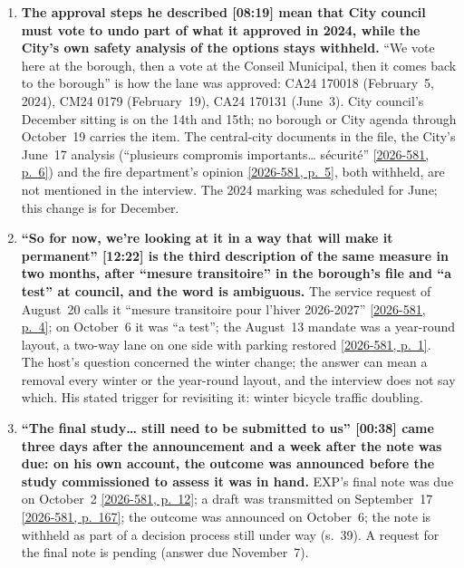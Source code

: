 \documentclass[11pt,letterpaper]{article}
\newcommand{\pagesurl}{https://openmobilitydata.github.io/Terrebonne-access-requests}
\newcommand{\cliptime}[1]{\textsf{\small[#1]}}
\newcommand{\pgl}[2]{\href{\pagesurl/2026-581/raw/01_emails_mandate_counts.pdf\#page=#1}{\textsf{\small[2026-581, p.~#2]}}}
\newcommand{\pg}[1]{\pgl{#1}{#1}}
\begin{document}
\begin{enumerate}[nosep]
  \item \begin{minipage}[t]{\linewidth}\textbf{The approval steps he described \cliptime{08:19} mean that City council must vote to undo part of what it approved in 2024, while the City's own safety analysis of the options stays withheld.} ``We vote here at the borough, then a vote at the Conseil Municipal, then it comes back to the borough'' is how the lane was approved: CA24 170018 (February~5, 2024), CM24 0179 (February~19), CA24 170131 (June~3). City council's December sitting is on the 14th and 15th; no borough or City agenda through October~19 carries the item. The central-city documents in the file, the City's June~17 analysis (``plusieurs compromis importants… sécurité'' \pg{6}) and the fire department's opinion \pg{5}, both withheld, are not mentioned in the interview. The 2024 marking was scheduled for June; this change is for December.\end{minipage}\vspace{0.35em}
  \item \begin{minipage}[t]{\linewidth}\textbf{``So for now, we're looking at it in a way that will make it permanent'' \cliptime{12:22} is the third description of the same measure in two months, after ``mesure transitoire'' in the borough's file and ``a test'' at council, and the word is ambiguous.} The service request of August~20 calls it ``mesure transitoire pour l'hiver 2026-2027'' \pg{4}; on October~6 it was ``a test''; the August~13 mandate was a year-round layout, a two-way lane on one side with parking restored \pg{1}. The host's question concerned the winter change; the answer can mean a removal every winter or the year-round layout, and the interview does not say which. His stated trigger for revisiting it: winter bicycle traffic doubling.\end{minipage}\vspace{0.35em}
  \item \begin{minipage}[t]{\linewidth}\textbf{``The final study… still need to be submitted to us'' \cliptime{00:38} came three days after the announcement and a week after the note was due: on his own account, the outcome was announced before the study commissioned to assess it was in hand.} EXP's final note was due on October~2 \pg{12}; a draft was transmitted on September~17 \pg{167}; the outcome was announced on October~6; the note is withheld as part of a decision process still under way (s.~39). A request for the final note is pending (answer due November~7).\end{minipage}\vspace{0.35em}

\end{enumerate}
\end{document}
